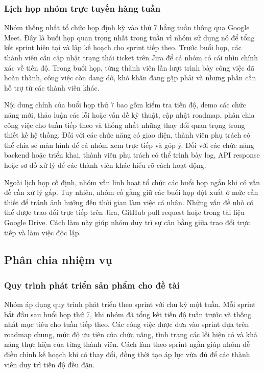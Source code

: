 \subsubsection{Lịch họp nhóm trực tuyến hàng tuần}
\par Nhóm thống nhất tổ chức họp định kỳ vào thứ 7 hằng tuần thông qua Google Meet. Đây là buổi họp quan trọng nhất trong tuần vì nhóm sử dụng nó để tổng kết sprint hiện tại và lập kế hoạch cho sprint tiếp theo. Trước buổi họp, các thành viên cần cập nhật trạng thái ticket trên Jira để cả nhóm có cái nhìn chính xác về tiến độ. Trong buổi họp, từng thành viên lần lượt trình bày công việc đã hoàn thành, công việc còn dang dở, khó khăn đang gặp phải và những phần cần hỗ trợ từ các thành viên khác.

\par Nội dung chính của buổi họp thứ 7 bao gồm kiểm tra tiến độ, demo các chức năng mới, thảo luận các lỗi hoặc vấn đề kỹ thuật, cập nhật roadmap, phân chia công việc cho tuần tiếp theo và thống nhất những thay đổi quan trọng trong thiết kế hệ thống. Đối với các chức năng có giao diện, thành viên phụ trách có thể chia sẻ màn hình để cả nhóm xem trực tiếp và góp ý. Đối với các chức năng backend hoặc triển khai, thành viên phụ trách có thể trình bày log, API response hoặc sơ đồ xử lý để các thành viên khác hiểu rõ cách hoạt động.

\par Ngoài lịch họp cố định, nhóm vẫn linh hoạt tổ chức các buổi họp ngắn khi có vấn đề cần xử lý gấp. Tuy nhiên, nhóm cố gắng giữ các buổi họp đột xuất ở mức cần thiết để tránh ảnh hưởng đến thời gian làm việc cá nhân. Những vấn đề nhỏ có thể được trao đổi trực tiếp trên Jira, GitHub pull request hoặc trong tài liệu Google Drive. Cách làm này giúp nhóm duy trì sự cân bằng giữa trao đổi trực tiếp và làm việc độc lập.

\subsection{Phân chia nhiệm vụ}

\subsubsection{Quy trình phát triển sản phẩm cho đề tài}
\par Nhóm áp dụng quy trình phát triển theo sprint với chu kỳ một tuần. Mỗi sprint bắt đầu sau buổi họp thứ 7, khi nhóm đã tổng kết tiến độ tuần trước và thống nhất mục tiêu cho tuần tiếp theo. Các công việc được đưa vào sprint dựa trên roadmap chung, mức độ ưu tiên của chức năng, tình trạng các lỗi hiện có và khả năng thực hiện của từng thành viên. Cách làm theo sprint ngắn giúp nhóm dễ điều chỉnh kế hoạch khi có thay đổi, đồng thời tạo áp lực vừa đủ để các thành viên duy trì tiến độ đều đặn.

